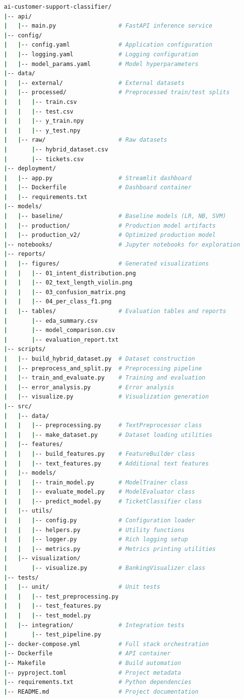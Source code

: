 \documentclass[12pt,a4paper]{article}
\begin{document}
\begin{lstlisting}[language=bash, caption={Project directory structure}]
ai-customer-support-classifier/
|-- api/
|   |-- main.py                  # FastAPI inference service
|-- config/
|   |-- config.yaml              # Application configuration
|   |-- logging.yaml             # Logging configuration
|   |-- model_params.yaml        # Model hyperparameters
|-- data/
|   |-- external/                # External datasets
|   |-- processed/               # Preprocessed train/test splits
|   |   |-- train.csv
|   |   |-- test.csv
|   |   |-- y_train.npy
|   |   |-- y_test.npy
|   |-- raw/                     # Raw datasets
|       |-- hybrid_dataset.csv
|       |-- tickets.csv
|-- deployment/
|   |-- app.py                   # Streamlit dashboard
|   |-- Dockerfile               # Dashboard container
|   |-- requirements.txt
|-- models/
|   |-- baseline/                # Baseline models (LR, NB, SVM)
|   |-- production/              # Production model artifacts
|   |-- production_v2/           # Optimized production model
|-- notebooks/                   # Jupyter notebooks for exploration
|-- reports/
|   |-- figures/                 # Generated visualizations
|   |   |-- 01_intent_distribution.png
|   |   |-- 02_text_length_violin.png
|   |   |-- 03_confusion_matrix.png
|   |   |-- 04_per_class_f1.png
|   |-- tables/                  # Evaluation tables and reports
|       |-- eda_summary.csv
|       |-- model_comparison.csv
|       |-- evaluation_report.txt
|-- scripts/
|   |-- build_hybrid_dataset.py  # Dataset construction
|   |-- preprocess_and_split.py  # Preprocessing pipeline
|   |-- train_and_evaluate.py    # Training and evaluation
|   |-- error_analysis.py        # Error analysis
|   |-- visualize.py             # Visualization generation
|-- src/
|   |-- data/
|   |   |-- preprocessing.py     # TextPreprocessor class
|   |   |-- make_dataset.py      # Dataset loading utilities
|   |-- features/
|   |   |-- build_features.py    # FeatureBuilder class
|   |   |-- text_features.py     # Additional text features
|   |-- models/
|   |   |-- train_model.py       # ModelTrainer class
|   |   |-- evaluate_model.py    # ModelEvaluator class
|   |   |-- predict_model.py     # TicketClassifier class
|   |-- utils/
|   |   |-- config.py            # Configuration loader
|   |   |-- helpers.py           # Utility functions
|   |   |-- logger.py            # Rich logging setup
|   |   |-- metrics.py           # Metrics printing utilities
|   |-- visualization/
|       |-- visualize.py         # BankingVisualizer class
|-- tests/
|   |-- unit/                    # Unit tests
|   |   |-- test_preprocessing.py
|   |   |-- test_features.py
|   |   |-- test_model.py
|   |-- integration/             # Integration tests
|       |-- test_pipeline.py
|-- docker-compose.yml           # Full stack orchestration
|-- Dockerfile                   # API container
|-- Makefile                     # Build automation
|-- pyproject.toml               # Project metadata
|-- requirements.txt             # Python dependencies
|-- README.md                    # Project documentation
\end{lstlisting}
\end{document}
